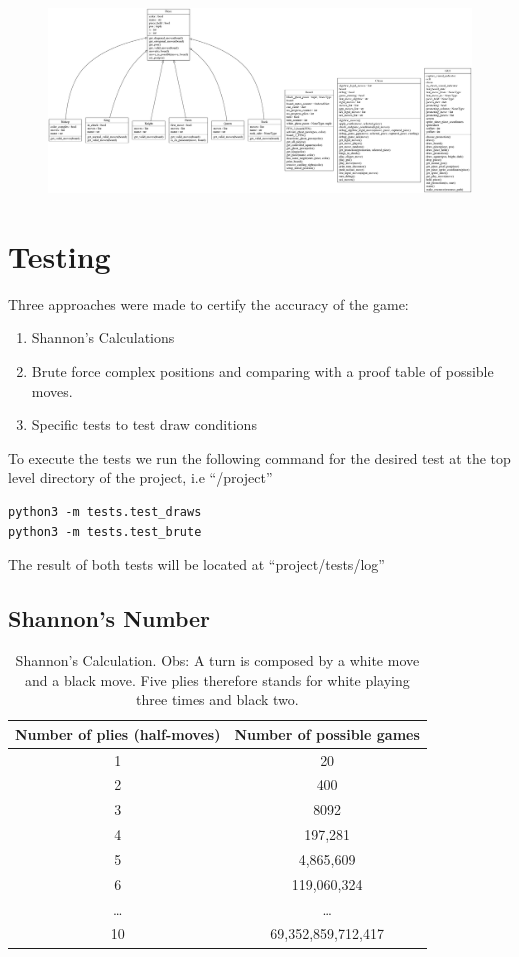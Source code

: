 \documentclass[10pt]{article}
\begin{document}
\begin{figure}[H]
    \includegraphics[scale=0.2]{fig/classes_Chess.png}
\end{figure}


\section{Testing}

Three approaches were made to certify the accuracy of the game:

\begin{enumerate}[label=\arabic*)]
\item Shannon's Calculations
\item Brute force complex positions and comparing with a proof table of possible
    moves. 
\item Specific tests to test draw conditions
\end{enumerate}

To execute the tests we run the following command for the desired test at the top level directory of the project, i.e ``/project''
\begin{lstlisting}
python3 -m tests.test_draws
python3 -m tests.test_brute
\end{lstlisting}

The result of both tests will be located at ``project/tests/log''


\subsection{Shannon's Number}


\begin{table}[H]
\center
\begin{tabular}{|c|c|}
\hline
\textbf{Number of plies (half-moves)}  & \textbf{Number of possible games}  \\
\hline
  1   & 20 \\
\hline
   2  &  400 \\
\hline
  3   & 8092 \\
\hline
4  & 197,281 \\
\hline
5   & 4,865,609 \\
\hline
6   & 119,060,324 \\
\hline
\ldots & \ldots \\
\hline
10 & 69,352,859,712,417 \\
\hline
\end{tabular}
\caption{Shannon's Calculation. Obs: A turn is composed by a white move and a black move. Five plies
therefore stands for white playing three times and black two.}
\end{table}
\end{document}
